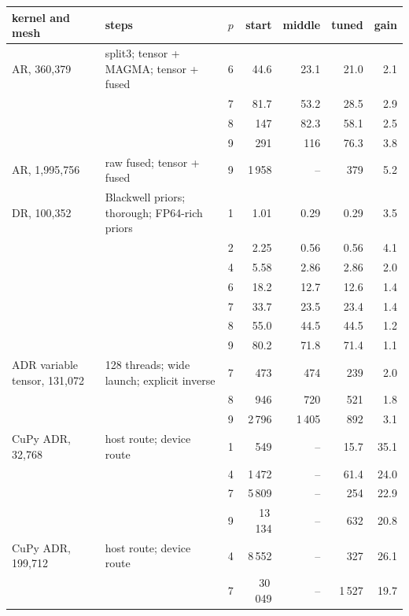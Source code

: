 \begin{tabular}{llrrrrr}
\toprule
kernel and mesh & steps & $p$ & start & middle & tuned & gain\\
\midrule
AR, 360,379 & split3; tensor + MAGMA; tensor + fused & 6 & 44.6 & 23.1 & 21.0 & 2.1\\
 &  & 7 & 81.7 & 53.2 & 28.5 & 2.9\\
 &  & 8 & 147 & 82.3 & 58.1 & 2.5\\
 &  & 9 & 291 & 116 & 76.3 & 3.8\\
\addlinespace[2pt]
AR, 1,995,756 & raw fused; tensor + fused & 9 & 1\,958 & -- & 379 & 5.2\\
\addlinespace[2pt]
DR, 100,352 & Blackwell priors; thorough; FP64-rich priors & 1 & 1.01 & 0.29 & 0.29 & 3.5\\
 &  & 2 & 2.25 & 0.56 & 0.56 & 4.1\\
 &  & 4 & 5.58 & 2.86 & 2.86 & 2.0\\
 &  & 6 & 18.2 & 12.7 & 12.6 & 1.4\\
 &  & 7 & 33.7 & 23.5 & 23.4 & 1.4\\
 &  & 8 & 55.0 & 44.5 & 44.5 & 1.2\\
 &  & 9 & 80.2 & 71.8 & 71.4 & 1.1\\
\addlinespace[2pt]
ADR variable tensor, 131,072 & 128 threads; wide launch; explicit inverse & 7 & 473 & 474 & 239 & 2.0\\
 &  & 8 & 946 & 720 & 521 & 1.8\\
 &  & 9 & 2\,796 & 1\,405 & 892 & 3.1\\
\addlinespace[2pt]
CuPy ADR, 32,768 & host route; device route & 1 & 549 & -- & 15.7 & 35.1\\
 &  & 4 & 1\,472 & -- & 61.4 & 24.0\\
 &  & 7 & 5\,809 & -- & 254 & 22.9\\
 &  & 9 & 13\,134 & -- & 632 & 20.8\\
\addlinespace[2pt]
CuPy ADR, 199,712 & host route; device route & 4 & 8\,552 & -- & 327 & 26.1\\
 &  & 7 & 30\,049 & -- & 1\,527 & 19.7\\
\bottomrule
\end{tabular}
